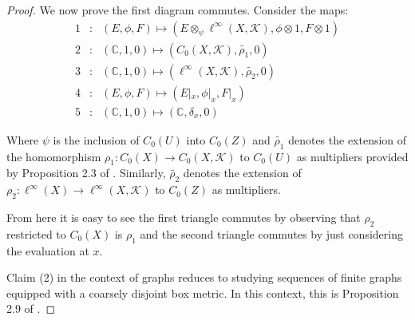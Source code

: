 \documentclass[preprint]{elsarticle}
\theoremstyle{plain}
\theoremstyle{definition}%
\theoremstyle{remark}%
\begin{document}
\begin{proof}
We now prove the first diagram commutes. Consider the maps:
\begin{eqnarray*}
1 & : & (E,\phi , F) \mapsto (E\otimes_{\psi}\ell^{\infty}(X,\mathcal{K}),\phi \otimes 1 , F \otimes 1)\\
2 & : & (\mathbb{C},1,0) \mapsto (C_{0}(X,\mathcal{K}),\tilde{\rho_{1}},0)\\
3 & : & (\mathbb{C},1,0) \mapsto (\ell^{\infty}(X,\mathcal{K}),\tilde{\rho_{2}},0)\\
4 & : & (E,\phi , F) \mapsto (E|_{x},\phi|_{x},F|_{x})\\
5 & : & (\mathbb{C},1,0) \mapsto (\mathbb{C},\delta_{x},0)
\end{eqnarray*}

Where $\psi$ is the inclusion of $C_{0}(U)$ into $C_{0}(Z)$ and $\tilde{\rho_{1}}$ denotes the extension of the homomorphism $\rho_{1}: C_{0}(X) \rightarrow C_{0}(X,\mathcal{K})$ to $C_{0}(U)$ as multipliers provided by Proposition 2.3 of \cite{MR1325694}. Similarly, $\tilde{\rho_{2}}$ denotes the extension of $\rho_{2}: \ell^{\infty}(X) \rightarrow \ell^{\infty}(X,\mathcal{K})$ to $C_{0}(Z)$ as multipliers.

From here it is easy to see the first triangle commutes by observing that $\rho_{2}$ restricted to $C_{0}(X)$ is $\rho_{1}$ and the second triangle commutes by just considering the evaluation at $x$.

Claim (2) in the context of graphs reduces to studying sequences of finite graphs equipped with a coarsely disjoint box metric. In this context, this is Proposition 2.9 of \cite{mypub1}.
\end{proof}
\end{document}
